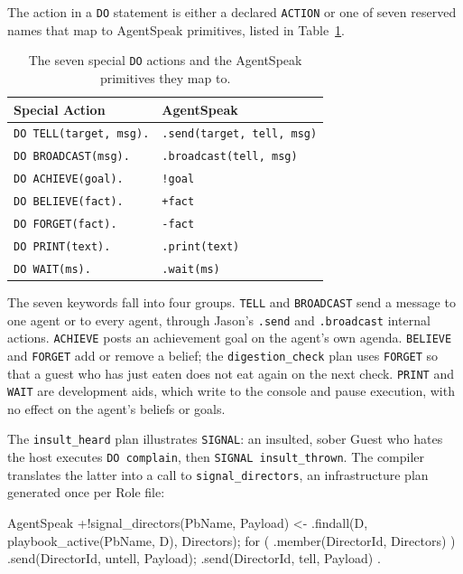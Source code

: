 The action in a \lstinline|DO| statement is either a declared \lstinline|ACTION| or one of seven reserved names that map to AgentSpeak primitives, listed in Table~\ref{tab:special-action-mapping}.
 
\begin{table}[h]
\centering
\begin{tabular}{|l|l|}
\hline
\textbf{Special Action} & \textbf{AgentSpeak} \\
\hline
\lstinline|DO TELL(target, msg).| & \lstinline|.send(target, tell, msg)| \\
\lstinline|DO BROADCAST(msg).| & \lstinline|.broadcast(tell, msg)| \\
\lstinline|DO ACHIEVE(goal).| & \lstinline|!goal| \\
\lstinline|DO BELIEVE(fact).| & \lstinline|+fact| \\
\lstinline|DO FORGET(fact).| & \lstinline|-fact| \\
\lstinline|DO PRINT(text).| & \lstinline|.print(text)| \\
\lstinline|DO WAIT(ms).| & \lstinline|.wait(ms)| \\
\hline
\end{tabular}
\caption{The seven special \lstinline|DO| actions and the AgentSpeak primitives they map to.}
\label{tab:special-action-mapping}
\end{table}
 
The seven keywords fall into four groups. \lstinline|TELL| and \lstinline|BROADCAST| send a message to one agent or to every agent, through Jason's \lstinline|.send| and \lstinline|.broadcast| internal actions. \lstinline|ACHIEVE| posts an achievement goal on the agent's own agenda. \lstinline|BELIEVE| and \lstinline|FORGET| add or remove a belief; the \lstinline|digestion_check| plan uses \lstinline|FORGET| so that a guest who has just eaten does not eat again on the next check. \lstinline|PRINT| and \lstinline|WAIT| are development aids, which write to the console and pause execution, with no effect on the agent's beliefs or goals.
 
The \lstinline|insult_heard| plan illustrates \lstinline|SIGNAL|: an insulted, sober Guest who hates the host executes \lstinline|DO complain|, then \lstinline|SIGNAL insult_thrown|. The compiler translates the latter into a call to \lstinline|signal_directors|, an infrastructure plan generated once per Role file:
 
\begin{codeblock}[]{AgentSpeak}
+!signal_directors(PbName, Payload) <-
    .findall(D, playbook_active(PbName, D), Directors);
    for ( .member(DirectorId, Directors) ) {
        .send(DirectorId, untell, Payload);
        .send(DirectorId, tell, Payload)
    }.
\end{codeblock}
 

